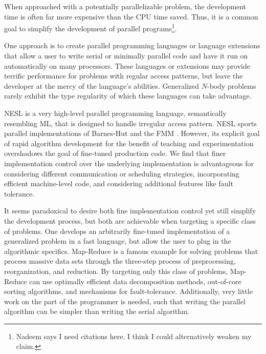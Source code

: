 \documentclass[twoside,leqno,twocolumn]{article}
\begin{document}
When approached with a potentially parallelizable problem, the development time is often far more expensive than the CPU time saved.
Thus, it is a common goal to simplify the development of parallel programs\footnote{Nadeem says I need citations here.  I think I could alternatively weaken my claim.}.

One approach is to create parallel programming languages or language extensions that allow a user to write serial or minimally parallel code and have it run on automatically on many processors.
These languages or extensions may provide terrific performance for problems with regular access patterns, but leave the developer at the mercy of the language's abilities.
Generalized $N$-body problems rarely exhibit the type regularity of which these languages can take advantage.

NESL is a very high-level parallel programming language, semantically resembling ML, that is designed to handle irregular access pattern.
NESL sports parallel implementations of Barnes-Hut and the FMM \cite{blelloch_nbody}.
However, its explicit goal of rapid algorithm development for the benefit of teaching and experimentation overshadows the goal of fine-tuned production code.
We find that finer implementation control over the underlying implementation is advantageous for considering different communication or scheduling strategies, incorporating efficient machine-level code, and considering additional features like fault tolerance.

It seems paradoxical to desire both fine implementation control yet still simplify the development process, but both are achievable when targeting a specific class of problems.
One develops an arbitrarily fine-tuned implementation of a generalized problem in a fast language, but allow the user to plug in the algorithmic specifics.
Map-Reduce\cite{mapreduce} is a famous example for solving problems that process massive data sets through the three-step process of preprocessing, reorganization, and reduction.
By targeting only this class of problems, Map-Reduce can use optimally efficient data decomposition methods, out-of-core sorting algorithms, and mechanisms for fault-tolerance.
Additionally, very little work on the part of the programmer is needed, such that writing the parallel algorithm can be simpler than writing the serial algorithm.
\end{document}
